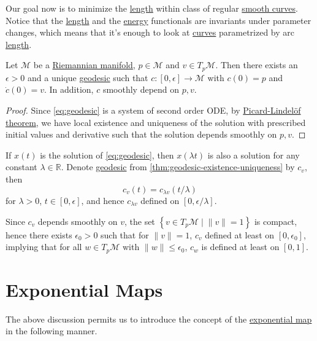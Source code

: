 Our goal now is to minimize the \hyperref[def:length]{length} within class of regular \hyperref[def:curve]{smooth curves}. Notice that the \hyperref[def:length]{length} and the \hyperref[def:energy]{energy} functionals are invariants under parameter changes, which means that it's enough to look at \hyperref[def:curve]{curves} parametrized by arc \hyperref[def:length]{length}.

\begin{theorem}\label{thm:geodesic-existence-uniqueness}
	Let \(\mathcal{M} \) be a \hyperref[def:Riemannian-manifold]{Riemannian manifold}, \(p\in \mathcal{M} \) and \(v\in T_p \mathcal{M} \). Then there exists an \(\epsilon > 0\) and a unique \hyperref[def:geodesic]{geodesic} such that \(c\colon [0, \epsilon ] \to \mathcal{M} \) with \(c(0) = p\) and \(\dot{c}(0) = v\). In addition, \(c\) smoothly depend on \(p, v\).
\end{theorem}
\begin{proof}
	Since \autoref{eq:geodesic} is a system of second order ODE, by \href{https://en.wikipedia.org/wiki/Picard%E2%80%93Lindel%C3%B6f_theorem}{Picard-Lindelöf theorem}, we have local existence and uniqueness of the solution with prescribed initial values and derivative such that the solution depends smoothly on \(p, v\).
\end{proof}

If \(x(t)\) is the solution of \autoref{eq:geodesic}, then \(x(\lambda t)\) is also a solution for any constant \(\lambda \in \mathbb{R} \). Denote \hyperref[def:geodesic]{geodesic} from \autoref{thm:geodesic-existence-uniqueness} by \(c_v\), then
\[
	c_v(t) = c_{\lambda v}(t / \lambda )
\]
for \(\lambda > 0\), \(t\in [0, \epsilon ]\), and hence \(c_{\lambda v}\) defined on \([0, \epsilon / \lambda ]\).

\begin{remark}
	Since \(c_v\) depends smoothly on \(v\), the set \(\left\{ v\in T_p \mathcal{M} \mid \lVert v \rVert = 1 \right\} \) is compact, hence there exists \(\epsilon _0 > 0\) such that for \(\lVert v \rVert = 1\), \(c_v\) defined at least on \([0, \epsilon _0]\), implying that for all \(w\in T_p \mathcal{M} \) with \(\lVert w \rVert \leq \epsilon _0\), \(c_w\) is defined at least on \([0, 1]\).
\end{remark}

\section{Exponential Maps}
The above discussion permits us to introduce the concept of the \hyperref[def:exponential-map]{exponential map} in the following manner.

